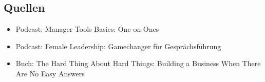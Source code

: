 \subsection{Quellen}

\begin{itemize}
    \item Podcast: Manager Tools Basics: One on Ones \cite[04.\,07.\,2005 bis 11.\,07.\,2005]{manager-tools-basics}
    \item Podcast: Female Leadership: Gamechanger für Gesprächsführung \cite[Folge 15]{female-leadership-gespraechsfuehrung}
    \item Buch: The Hard Thing About Hard Things: Building a Business When There Are No Easy Answers \cite{the-hard-thing-about-hard-things}
\end{itemize}
